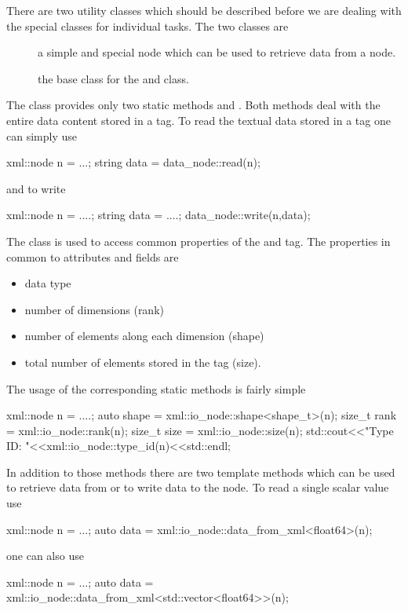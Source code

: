 There are two utility classes which should be described before we are dealing 
with the special classes for individual tasks. The two classes are 
\begin{description}
    \item[] a simple and special node which can be used to 
    retrieve data from a node. 
    \item[] the base class for the  and 
     class.
\end{description}
The  class provides only two static methods  and 
. Both methods deal with the entire data content stored in a tag. 
To read the textual data stored in a tag one can simply use
\begin{cppcode}
xml::node n = ...;
string data = data_node::read(n);
\end{cppcode}
and to write 
\begin{cppcode}
xml::node n = ....;
string data = ....;
data_node::write(n,data);
\end{cppcode}
The  class is used to access common properties of the 
 and  tag. The properties in common to 
attributes and fields are
\begin{itemize}
    \item data type
    \item number of dimensions (rank)
    \item number of elements along each dimension (shape)
    \item total number of elements stored in the tag (size).
\end{itemize}
The usage of the corresponding static methods is fairly simple 
\begin{cppcode}
xml::node n = ....;
auto shape = xml::io_node::shape<shape_t>(n);
size_t rank = xml::io_node::rank(n);
size_t size = xml::io_node::size(n);
std::cout<<"Type ID: "<<xml::io_node::type_id(n)<<std::endl;
\end{cppcode}
In addition to those methods there are two template methods which can be used 
to retrieve data from or to write data to the node. To read a single 
scalar value use
\begin{cppcode}
xml::node n = ...;
auto data = xml::io_node::data_from_xml<float64>(n);
\end{cppcode}
one can also use  
\begin{cppcode}
xml::node n = ...;
auto data = xml::io_node::data_from_xml<std::vector<float64>>(n);
\end{cppcode}


